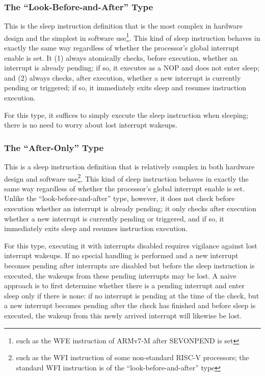 \subsubsection{The ``Look-Before-and-After'' Type}\label{subsubsec:9-sleep-look-before-and-after}

This is the sleep instruction definition that is the most complex in hardware design and the simplest in software use\footnote{such as the WFE instruction of ARMv7-M after SEVONPEND is set}. This kind of sleep instruction behaves in exactly the same way regardless of whether the processor's global interrupt enable is set. It (1) always atomically checks, before execution, whether an interrupt is already pending; if so, it executes as a NOP and does not enter sleep; and (2) always checks, after execution, whether a new interrupt is currently pending or triggered; if so, it immediately exits sleep and resumes instruction execution.

For this type, it suffices to simply execute the sleep instruction when sleeping; there is no need to worry about lost interrupt wakeups.

\subsubsection{The ``After-Only'' Type}\label{subsubsec:9-sleep-after-only}

This is a sleep instruction definition that is relatively complex in both hardware design and software use\footnote{such as the WFI instruction of some non-standard RISC-V processors; the standard WFI instruction is of the ``look-before-and-after'' type}. This kind of sleep instruction behaves in exactly the same way regardless of whether the processor's global interrupt enable is set. Unlike the ``look-before-and-after'' type, however, it does not check before execution whether an interrupt is already pending; it only checks after execution whether a new interrupt is currently pending or triggered, and if so, it immediately exits sleep and resumes instruction execution.

For this type, executing it with interrupts disabled requires vigilance against lost interrupt wakeups. If no special handling is performed and a new interrupt becomes pending after interrupts are disabled but before the sleep instruction is executed, the wakeups from these pending interrupts may be lost. A naive approach is to first determine whether there is a pending interrupt and enter sleep only if there is none: if no interrupt is pending at the time of the check, but a new interrupt becomes pending after the check has finished and before sleep is executed, the wakeup from this newly arrived interrupt will likewise be lost.

